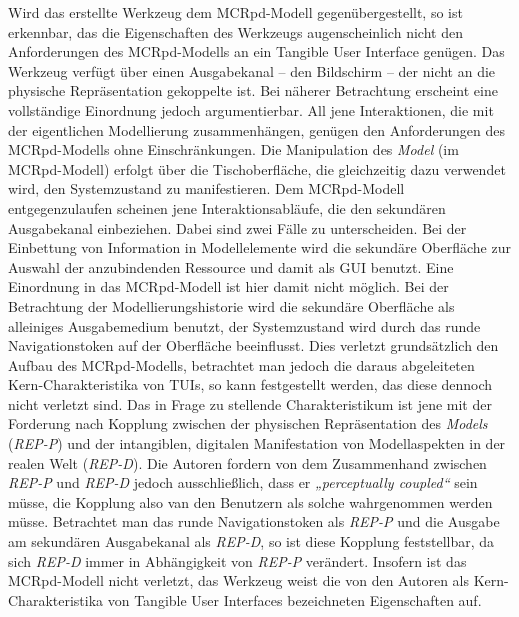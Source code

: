 Wird das erstellte Werkzeug dem \gls{MCRpd}-Modell gegenübergestellt, so ist erkennbar, das die Eigenschaften des Werkzeugs augenscheinlich nicht den Anforderungen des \gls{MCRpd}-Modells an ein Tangible User Interface genügen. Das Werkzeug verfügt über einen Ausgabekanal -- den Bildschirm -- der nicht an die physische Repräsentation gekoppelte ist. Bei näherer Betrachtung erscheint eine vollständige Einordnung jedoch argumentierbar. All jene Interaktionen, die mit der eigentlichen Modellierung zusammenhängen, genügen den Anforderungen des \gls{MCRpd}-Modells ohne Einschränkungen. Die Manipulation des \emph{Model} (im \gls{MCRpd}-Modell) erfolgt über die Tischoberfläche, die gleichzeitig dazu verwendet wird, den Systemzustand zu manifestieren. Dem \gls{MCRpd}-Modell entgegenzulaufen scheinen jene Interaktionsabläufe, die den sekundären Ausgabekanal einbeziehen. Dabei sind zwei Fälle zu unterscheiden. Bei der Einbettung von Information in Modellelemente wird die sekundäre Oberfläche zur Auswahl der anzubindenden Ressource und damit als \gls{GUI} benutzt. Eine Einordnung in das \gls{MCRpd}-Modell ist hier damit nicht möglich. Bei der Betrachtung der Modellierungshistorie wird die sekundäre Oberfläche als alleiniges Ausgabemedium benutzt, der Systemzustand wird durch das runde Navigationstoken auf der Oberfläche beeinflusst. Dies verletzt grundsätzlich den Aufbau des MCRpd-Modells, betrachtet man jedoch die daraus abgeleiteten Kern-Charakteristika von \glspl{TUI}, so kann festgestellt werden, das diese dennoch nicht verletzt sind. Das in Frage zu stellende Charakteristikum ist jene mit der Forderung nach Kopplung zwischen der physischen Repräsentation des \emph{Models} (\emph{REP-P}) und der intangiblen, digitalen Manifestation von Modellaspekten in der realen Welt (\emph{REP-D}). Die Autoren fordern von dem Zusammenhand zwischen \emph{REP-P} und \emph{REP-D} jedoch ausschließlich, dass er \emph{„perceptually coupled“} sein müsse, die Kopplung also van den Benutzern als solche wahrgenommen werden müsse. Betrachtet man das runde Navigationstoken als \emph{REP-P} und die Ausgabe am sekundären Ausgabekanal als \emph{REP-D}, so ist diese Kopplung feststellbar, da sich \emph{REP-D} immer in Abhängigkeit von \emph{REP-P} verändert. Insofern ist das \gls{MCRpd}-Modell nicht verletzt, das Werkzeug weist die von den Autoren als Kern-Charakteristika von Tangible User Interfaces bezeichneten Eigenschaften auf.

